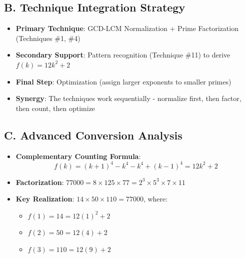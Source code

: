 \documentclass[11pt]{article}
\begin{document}
\begin{conversionbox}
\subsection*{B. Technique Integration Strategy}
\begin{itemize}[leftmargin=*]
    \item \textbf{Primary Technique}: GCD-LCM Normalization + Prime Factorization (Techniques \#1, \#4)
    \item \textbf{Secondary Support}: Pattern recognition (Technique \#11) to derive $f(k) = 12k^2 + 2$
    \item \textbf{Final Step}: Optimization (assign larger exponents to smaller primes)
    \item \textbf{Synergy}: The techniques work sequentially - normalize first, then factor, then count, then optimize
\end{itemize}

\subsection*{C. Advanced Conversion Analysis}
\begin{itemize}[leftmargin=*]
    \item \textbf{Complementary Counting Formula}:
    \[f(k) = (k+1)^4 - k^4 - k^4 + (k-1)^4 = 12k^2 + 2\]
    \item \textbf{Factorization}: $77000 = 8 \times 125 \times 77 = 2^3 \times 5^3 \times 7 \times 11$
    \item \textbf{Key Realization}: $14 \times 50 \times 110 = 77000$, where:
    \begin{itemize}
        \item $f(1) = 14 = 12(1)^2 + 2$
        \item $f(2) = 50 = 12(4) + 2$
        \item $f(3) = 110 = 12(9) + 2$
    \end{itemize}
\end{itemize}
\end{conversionbox}
\end{document}
